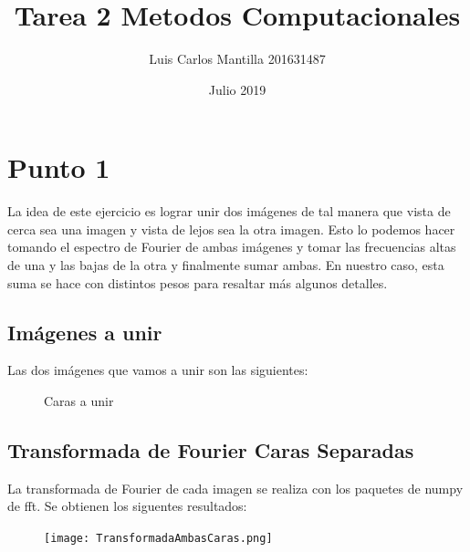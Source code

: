 \documentclass{article}
\title{Tarea 2 Metodos Computacionales}
\author{Luis Carlos Mantilla 201631487}
\date{Julio 2019}
\begin{document}
\maketitle

\section*{Punto 1}

La idea de este ejercicio es lograr unir dos im\'agenes de tal manera que vista de cerca sea una imagen y vista de lejos sea la otra imagen. Esto lo podemos hacer tomando el espectro de Fourier de ambas im\'agenes y tomar las frecuencias altas de una y las bajas de la otra y finalmente sumar ambas. En nuestro caso, esta suma se hace con distintos pesos para resaltar m\'as algunos detalles. 

\subsection*{Im\'agenes a unir}
Las dos im\'agenes que vamos a unir son las siguientes:
\begin{figure}[!htbp]
  \centering
  \hspace{0.2cm}
  \caption{Caras a unir}
\end{figure}

\subsection*{Transformada de Fourier Caras Separadas}
La transformada de Fourier de cada imagen se realiza con los paquetes de numpy de fft. Se obtienen los siguentes resultados:
\begin{figure}[!htbp]
 \centering
  \texttt{[image: TransformadaAmbasCaras.png]}
\end{figure}
\end{document}
